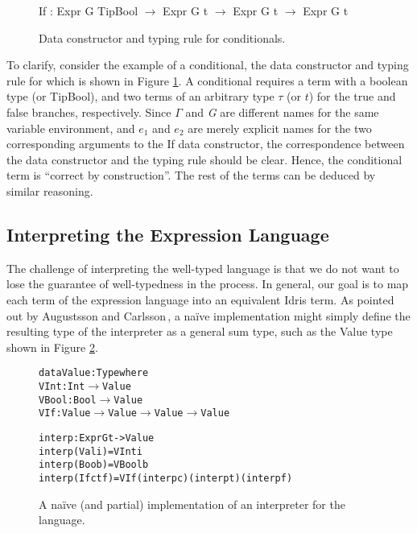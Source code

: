 \begin{figure}
\begin{center}
If : Expr G TipBool $\rightarrow$ Expr G t $\rightarrow$ Expr G t $\rightarrow$ Expr G t
\end{center}

\begin{prooftree}
\end{prooftree}
\caption{Data constructor and typing rule for conditionals.}
\label{fig:if-constructor-and-typing-rule}
\end{figure}
To clarify, consider the example of a conditional, the data constructor and typing rule for which is shown in Figure \ref{fig:if-constructor-and-typing-rule}. A conditional requires a term with a boolean type (or TipBool), and two terms of an arbitrary type $\tau$ (or $t$) for the true and false branches, respectively. Since $\Gamma$ and \textit{G} are different names for the same variable environment, and $e_{1}$ and $e_{2}$ are merely explicit names for the two corresponding arguments to the If data constructor, the correspondence between the data constructor and the typing rule should be clear. Hence, the conditional term is ``correct by construction''. The rest of the terms can be deduced by similar reasoning.

\subsection{Interpreting the Expression Language}
The challenge of interpreting the well-typed language is that we do not want to lose the guarantee of well-typedness in the process. In general, our goal is to map each term of the expression language into an equivalent Idris term. As pointed out by Augustsson and Carlsson\,\cite{Augustsson99anexercise}, a na\"{i}ve implementation might simply define the resulting type of the interpreter as a general sum type, such as the Value type shown in Figure \ref{fig:naive-interpreter-impl}.  

\begin{figure}
\begin{alltt}
data Value : Type where
  VInt  : Int \(\rightarrow\) Value
  VBool : Bool \(\rightarrow\) Value
  VIf   : Value \(\rightarrow\) Value \(\rightarrow\) Value \(\rightarrow\) Value

interp : Expr G t -> Value
interp (Val i) = VInt i
interp (Boo b) = VBool b
interp (If c t f) = VIf (interp c) (interp t) (interp f)
\end{alltt}
\caption{A na\"{i}ve (and partial) implementation of an interpreter for the language.}
\label{fig:naive-interpreter-impl}
\end{figure}
